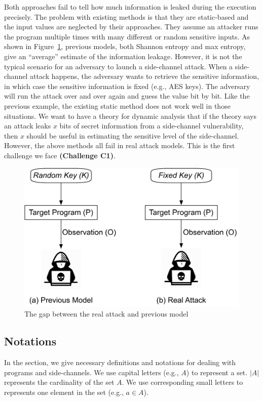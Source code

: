 Both approaches fail to tell how much information is leaked during the execution
precisely. The problem with existing methods is that they are static-based and
the input values are neglected by their approaches. They assume an
attacker runs the program multiple times with many different or random sensitive
inputs. As shown in Figure~\ref{fig:gap}, previous models,
both Shannon entropy and max entropy, give an ``average'' estimate of the
information leakage. However, it is not the typical scenario for an adversary to
launch a side-channel attack. When a side-channel attack happens, the adversary
wants to retrieve the sensitive information, in which case the sensitive
information is fixed (e.g., AES keys). The adversary will run the attack over
and over again and guess the value bit by bit. Like the previous example, the
existing static method does not work well in those situations. We want to have a
theory for dynamic analysis that if the theory says an attack leaks $x$ bits of
secret information from a side-channel vulnerability, then $x$ should be useful
in estimating the sensitive level of the side-channel. However, the above methods
all fail in real attack models. This is the first challenge we face
\textbf{(Challenge C1)}.

\begin{figure}
    \centering
    \includegraphics[width=.8\columnwidth]{./figures/RA.pdf}
    \caption{The gap between the real attack and previous model}\label{fig:gap}
\end{figure}


\subsection{Notations}
In the section, we give necessary definitions and notations for dealing with
programs and side-channels. We use capital letters (e.g., $A$) to represent a
set. $|A|$ represents the cardinality of the set $A$. We use corresponding small
letters to represents one element in the set (e.g., $a \in A$).

